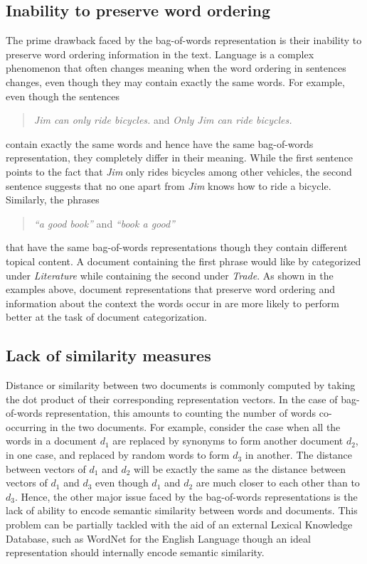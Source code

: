 \subsection{Inability to preserve word ordering}
The prime drawback faced by the bag-of-words representation is their inability to preserve word ordering information in the text. Language is a complex phenomenon that often changes meaning when the word ordering in sentences changes, even though they may contain exactly the same words. For example, even though the sentences
\begin{quote}
\centering
\emph{ 	Jim can only ride bicycles. } and \emph{ 	Only Jim can ride bicycles. }
\end{quote}
contain exactly the same words and hence have the same bag-of-words representation, they completely differ in their meaning. While the first sentence points to the fact that \emph{Jim} only rides bicycles among other vehicles, the second sentence suggests that no one apart from \emph{Jim} knows how to ride a bicycle. 
Similarly, the phrases 
\begin{quote}
\centering
\emph{ 	``a good book'' } and \emph{ 	``book a good'' }
\end{quote}
that have the same bag-of-words representations though they contain different topical content. A document containing the first phrase would like by categorized under \emph{Literature} while containing the second under \emph{Trade}.
As shown in the examples above, document representations that preserve word ordering and information about the context the words occur in are more likely to perform better at the task of document categorization.

\subsection{Lack of similarity measures}
Distance or similarity between two documents is commonly computed by taking the dot product of their corresponding representation vectors. In the case of bag-of-words representation, this amounts to counting the number of words co-occurring in the two documents. For example, consider the case when all the words in a document $d_{1}$ are replaced by synonyms to form another document $d_{2}$, in one case, and replaced by random words to form $d_{3}$ in another. The distance between vectors of $d_{1}$ and $d_{2}$ will be exactly the same as the distance between vectors of $d_{1}$ and $d_{3}$ even though $d_{1}$ and $d_{2}$ are much closer to each other than to $d_{3}$. 
Hence, the other major issue faced by the bag-of-words representations is the lack of ability to encode semantic similarity between words and documents. 
This problem can be partially tackled with the aid of an external Lexical Knowledge Database, such as WordNet for the English Language though an ideal representation should internally encode semantic similarity.

